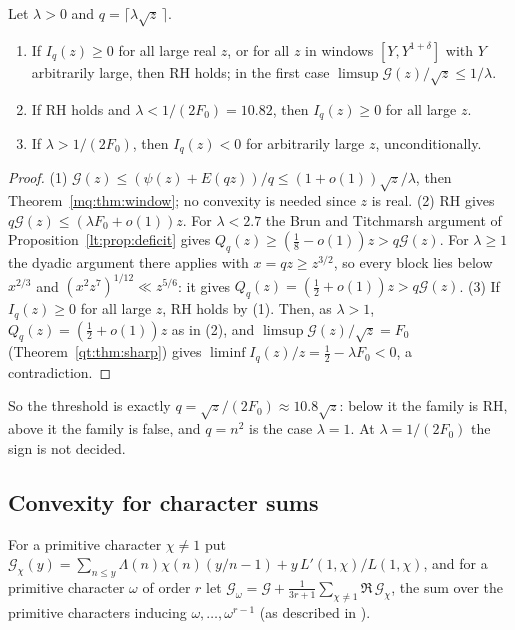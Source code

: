 \begin{theorem}\label{lt:thm:mult}
Let $\lambda>0$ and $q=\lceil\lambda\sqrt z\,\rceil$.
\begin{enumerate}
\item If $I_q(z)\ge0$ for all large real $z$, or for all $z$ in windows $[Y,Y^{1+\delta}]$ with $Y$ arbitrarily large, then RH holds; in the first case $\limsup\mathcal G(z)/\sqrt z\le1/\lambda$.
\item If RH holds and $\lambda<1/(2F_0)=10.82$, then $I_q(z)\ge0$ for all large $z$.
\item If $\lambda>1/(2F_0)$, then $I_q(z)<0$ for arbitrarily large $z$, unconditionally.
\end{enumerate}
\end{theorem}

\begin{proof}
(1) $\mathcal G(z)\le(\psi(z)+E(qz))/q\le(1+o(1))\sqrt z/\lambda$, then Theorem~\ref{mq:thm:window}; no convexity is needed since $z$ is real. (2) RH gives $q\mathcal G(z)\le(\lambda F_0+o(1))z$. For $\lambda<2.7$ the Brun and Titchmarsh argument of Proposition~\ref{lt:prop:deficit} gives $Q_q(z)\ge(\tfrac18-o(1))z>q\mathcal G(z)$. For $\lambda\ge1$ the dyadic argument there applies with $x=qz\ge z^{3/2}$, so every block lies below $x^{2/3}$ and $(x^2z^7)^{1/12}\ll z^{5/6}$: it gives $Q_q(z)=(\tfrac12+o(1))z>q\mathcal G(z)$. (3) If $I_q(z)\ge0$ for all large $z$, RH holds by (1). Then, as $\lambda>1$, $Q_q(z)=(\tfrac12+o(1))z$ as in (2), and $\limsup\mathcal G(z)/\sqrt z=F_0$ (Theorem~\ref{qt:thm:sharp}) gives $\liminf I_q(z)/z=\tfrac12-\lambda F_0<0$, a contradiction.
\end{proof}

So the threshold is exactly $q=\sqrt z/(2F_0)\approx10.8\sqrt z$: below it the family is RH, above it the family is false, and $q=n^2$ is the case $\lambda=1$. At $\lambda=1/(2F_0)$ the sign is not decided.

\subsection*{Convexity for character sums}
For a primitive character $\chi\ne1$ put $\mathcal G_\chi(y)=\sum_{n\le y}\Lambda(n)\chi(n)(y/n-1)+y\,L'(1,\chi)/L(1,\chi)$, and for a primitive character $\omega$ of order $r$ let $\mathcal G_\omega=\mathcal G+\frac1{3r+1}\sum_{\chi\ne1}\Re\,\mathcal G_\chi$, the sum over the primitive characters inducing $\omega,\dots,\omega^{r-1}$ (as described in \cite{ZhangR26}).

